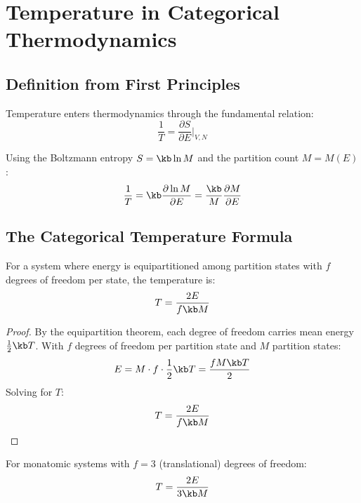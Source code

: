 \section{Temperature in Categorical Thermodynamics}

\subsection{Definition from First Principles}

Temperature enters thermodynamics through the fundamental relation:
\begin{equation}
\frac{1}{T} = \frac{\partial S}{\partial E}\bigg|_{V,N}
\label{eq:temp_fundamental}
\end{equation}

Using the Boltzmann entropy $S = \kb \ln M$ and the partition count $M = M(E)$:
\begin{equation}
\frac{1}{T} = \kb \frac{\partial \ln M}{\partial E} = \frac{\kb}{M} \frac{\partial M}{\partial E}
\label{eq:temp_derivative}
\end{equation}

\subsection{The Categorical Temperature Formula}

\begin{theorem}
\label{thm:categorical_temperature}
For a system where energy is equipartitioned among partition states with $f$ degrees of freedom per state, the temperature is:
\begin{equation}
T = \frac{2E}{f \kb M}
\label{eq:categorical_temperature}
\end{equation}
\end{theorem}

\begin{proof}
By the equipartition theorem, each degree of freedom carries mean energy $\frac{1}{2}\kb T$. With $f$ degrees of freedom per partition state and $M$ partition states:
\begin{equation}
E = M \cdot f \cdot \frac{1}{2} \kb T = \frac{f M \kb T}{2}
\end{equation}
Solving for $T$:
\begin{equation}
T = \frac{2E}{f \kb M}
\end{equation}
\end{proof}

\begin{corollary}
For monatomic systems with $f = 3$ (translational) degrees of freedom:
\begin{equation}
T = \frac{2E}{3\kb M}
\label{eq:monatomic_temperature}
\end{equation}
\end{corollary}

